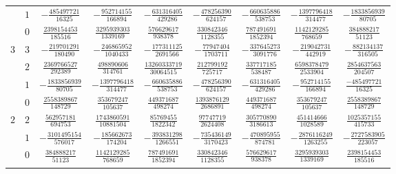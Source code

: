 \begin{table}
\begin{center}
\begin{tabular}{ccccccccc}
           &  $1$  &  $-\frac{ 485497721}{  16325}$  &  $-\frac{ 952714155}{  166894}$  &  $-\frac{  631316405}{  429286}$  &  $-\frac{ 478256390}{  624157}$  &  $-\frac{  660635886}{  538753}$  &  $-\frac{1397796418}{  314477} $  &  $-\frac{1833856939}{  80705}$  \\ \addlinespace
           &  $0$  &  $ \frac{2398154453}{ 185516}$  &  $ \frac{3295939303}{ 1339169}$  &  $ \frac{  576629617}{  938378}$  &  $ \frac{ 330842346}{ 1128355}$  &  $ \frac{  787491691}{ 1852394}$  &  $ \frac{1142129285}{  768659} $  &  $ \frac{ 384888217}{  51123}$  \\ \addlinespace
      $3$  &  $3$  &  $-\frac{ 219701291}{ 180490}$  &  $-\frac{ 246865952}{ 1040433}$  &  $-\frac{  177311125}{ 2691566}$  &  $-\frac{  77947404}{ 1703711}$  &  $-\frac{  337645273}{ 3091776}$  &  $-\frac{ 219042731}{  442919} $  &  $-\frac{ 882134137}{ 316505}$  \\ \addlinespace
           &  $2$  &  $ \frac{2369766527}{ 292389}$  &  $ \frac{ 498890606}{  314761}$  &  $ \frac{13260333719}{30064515}$  &  $ \frac{ 212799192}{  725717}$  &  $ \frac{  337717185}{  538487}$  &  $ \frac{6598378479}{ 2533904} $  &  $ \frac{2854637563}{ 204507}$  \\ \addlinespace
           &  $1$  &  $-\frac{1833856939}{  80705}$  &  $-\frac{1397796418}{  314477}$  &  $-\frac{  660635886}{  538753}$  &  $-\frac{ 478256390}{  624157}$  &  $-\frac{  631316405}{  429286}$  &  $-\frac{ 952714155}{  166894} $  &  $ \frac{-485497721}{  16325}$  \\ \addlinespace
           &  $0$  &  $ \frac{2558389867}{ 148729}$  &  $ \frac{ 353679247}{  105637}$  &  $ \frac{  449371687}{  498274}$  &  $ \frac{1393876129}{ 2686891}$  &  $ \frac{  449371687}{  498274}$  &  $ \frac{ 353679247}{  105637} $  &  $ \frac{2558389867}{ 148729}$  \\ \addlinespace
      $2$  &  $2$  &  $ \frac{ 562957181}{ 694753}$  &  $ \frac{1743860591}{10881504}$  &  $ \frac{   85769455}{ 1822342}$  &  $ \frac{  97747719}{ 2624408}$  &  $ \frac{  305770890}{ 3186613}$  &  $ \frac{ 451414666}{ 1028589} $  &  $ \frac{1025357155}{ 415733}$  \\ \addlinespace
           &  $1$  &  $-\frac{3101495154}{ 576017}$  &  $-\frac{ 185662673}{  174204}$  &  $-\frac{  393831298}{ 1266551}$  &  $-\frac{ 735436149}{ 3170423}$  &  $-\frac{  470895955}{  874781}$  &  $-\frac{2876116249}{ 1263255} $  &  $-\frac{2727583905}{ 223057}$  \\ \addlinespace
           &  $0$  &  $ \frac{ 384888217}{  51123}$  &  $ \frac{1142129285}{  768659}$  &  $ \frac{  787491691}{ 1852394}$  &  $ \frac{ 330842346}{ 1128355}$  &  $ \frac{  576629617}{  938378}$  &  $ \frac{3295939303}{ 1339169} $  &  $ \frac{2398154453}{ 185516}$  \\ \addlinespace

\end{tabular}
\end{center}
\end{table}
